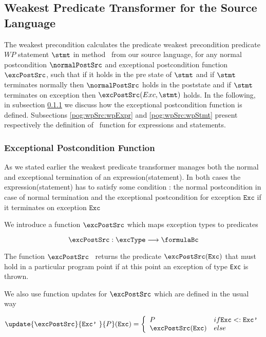 


\subsection{Weakest Predicate Transformer for the Source Language } \label{pog:wpSrc}

The weakest precondition calculates  the predicate weakest precondition predicate $WP$  statement $\stmt$ in method \methodd \ from our source language,
for any normal postcondition $\normalPostSrc$ and exceptional postcondition function $\excPostSrc$, 
 such that if it holds in the pre state of $\stmt$ and   if $\stmt$ terminates normally then $\normalPostSrc$  holds in the poststate and
 if $\stmt$ terminates on exception \Exc{} then $\excPostSrc(Exc, \stmt)$ holds. 
In the following, in  subsection   \ref{pog:wpSrc:excPost} we discuss how the exceptional postcondition function is defined.
Subsections \ref{pog:wpSrc:wpExpr} and  \ref{pog:wpSrc:wpStmt} present respectively
 the definition of \wpName \  function for expressions and statements.  
 



\subsubsection{Exceptional Postcondition Function}\label{pog:wpSrc:excPost}

As we stated earlier the weakest predicate transformer manages both the normal and
 exceptional termination of  an expression(statement). 
In both cases the expression(statement) has to satisfy some condition : 
the normal postcondition in case of normal termination and the exceptional postcondition
for exception $\texttt{Exc}$ if it terminates on exception $\texttt{Exc}$


We introduce a function $\excPostSrc$  which maps exception types to predicates  

$$ \excPostSrc :  \excType \longrightarrow   \formulaBc $$ 



The function $\excPostSrc$ \ returns the predicate $\excPostSrc (\mbox{\rm\texttt{Exc}}) $ that must hold in a particular program point if
 at this point an exception of type \mbox{\rm\texttt{Exc}} is thrown.





We also use  function updates for $\excPostSrc$ which are defined in the usual way


$$
\update{\excPostSrc}{\mbox{\rm\texttt{Exc'} }}{ P }( \mbox{\rm\texttt{Exc}} )  = 
       \left\{\begin{array}{ll} 
         P & if \mbox{\rm\texttt{Exc}}  <: \mbox{\rm\texttt{Exc'}}  \\
         \excPostSrc(\mbox{\rm\texttt{Exc}} ) & else 
     \end{array}\right.$$



